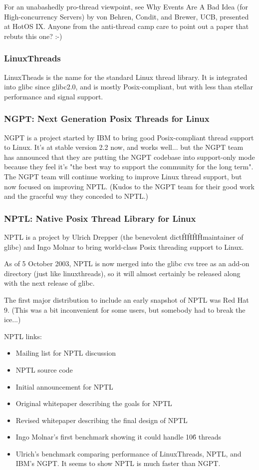 \documentclass[12pt, twoside, a4paper, xetex]{report}
\begin{document}
For an unabashedly pro-thread viewpoint, see Why Events Are A Bad Idea (for High-concurrency Servers) by von Behren, Condit, and Brewer, UCB, presented at HotOS IX. Anyone from the anti-thread camp care to point out a paper that rebuts this one? :-)

\subsubsection*{LinuxThreads}

LinuxTheads is the name for the standard Linux thread library. It is integrated into glibc since glibc2.0, and is mostly Posix-compliant, but with less than stellar performance and signal support.

\subsubsection*{NGPT: Next Generation Posix Threads for Linux}

NGPT is a project started by IBM to bring good Posix-compliant thread support to Linux. It's at stable version 2.2 now, and works well... but the NGPT team has announced that they are putting the NGPT codebase into support-only mode because they feel it's "the best way to support the community for the long term". The NGPT team will continue working to improve Linux thread support, but now focused on improving NPTL. (Kudos to the NGPT team for their good work and the graceful way they conceded to NPTL.)

\subsubsection*{NPTL: Native Posix Thread Library for Linux}

NPTL is a project by Ulrich Drepper (the benevolent dict\^H\^H\^H\^Hmaintainer of glibc) and Ingo Molnar to bring world-class Posix threading support to Linux.

As of 5 October 2003, NPTL is now merged into the glibc cvs tree as an add-on directory (just like linuxthreads), so it will almost certainly be released along with the next release of glibc.

The first major distribution to include an early snapshot of NPTL was Red Hat 9. (This was a bit inconvenient for some users, but somebody had to break the ice...)

NPTL links:

\begin{itemize}
\item Mailing list for NPTL discussion
\item NPTL source code
\item Initial announcement for NPTL
\item Original whitepaper describing the goals for NPTL
\item Revised whitepaper describing the final design of NPTL
\item Ingo Molnar's first benchmark showing it could handle 10\^6 threads
\item Ulrich's benchmark comparing performance of LinuxThreads, NPTL, and IBM's NGPT. It seems to show NPTL is much faster than NGPT.
\end{itemize}
\end{document}
